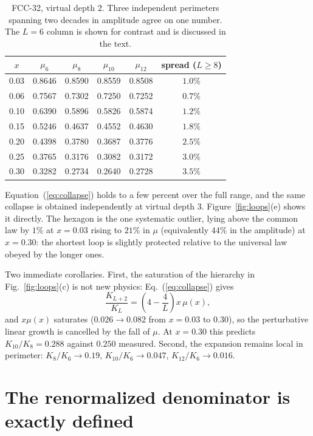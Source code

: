 \documentclass[aps,prb,preprint,amsmath,amssymb,superscriptaddress,
longbibliography,floatfix]{revtex4-2}
\begin{document}
\begin{table}[b]
\caption{FCC-32, virtual depth $2$.  Three independent perimeters spanning two
decades in amplitude agree on one number.  The $L=6$ column is shown for
contrast and is discussed in the text.}
\label{tab:collapse}
\begin{ruledtabular}
\begin{tabular}{cccccc}
$x$ & $\mu_6$ & $\mu_8$ & $\mu_{10}$ & $\mu_{12}$ & spread ($L\ge8$)\\ \hline
0.03 & 0.8646 & 0.8590 & 0.8559 & 0.8508 & $1.0\%$\\
0.06 & 0.7567 & 0.7302 & 0.7250 & 0.7252 & $0.7\%$\\
0.10 & 0.6390 & 0.5896 & 0.5826 & 0.5874 & $1.2\%$\\
0.15 & 0.5246 & 0.4637 & 0.4552 & 0.4630 & $1.8\%$\\
0.20 & 0.4398 & 0.3780 & 0.3687 & 0.3776 & $2.5\%$\\
0.25 & 0.3765 & 0.3176 & 0.3082 & 0.3172 & $3.0\%$\\
0.30 & 0.3282 & 0.2734 & 0.2640 & 0.2728 & $3.5\%$\\
\end{tabular}
\end{ruledtabular}
\end{table}

Equation~(\ref{eq:collapse}) holds to a few percent over the full range, and
the same collapse is obtained independently at virtual depth $3$.
Figure~\ref{fig:loops}(e) shows it directly.  The hexagon is the one
systematic outlier, lying above the common law by $1\%$ at $x=0.03$ rising to
$21\%$ in $\mu$ (equivalently $44\%$ in the amplitude) at $x=0.30$: the
shortest loop is slightly protected relative to the universal law obeyed by the
longer ones.

Two immediate corollaries.  First, the saturation of the hierarchy in
Fig.~\ref{fig:loops}(c) is not new physics: Eq.~(\ref{eq:collapse}) gives
\begin{equation}
 \frac{K_{L+2}}{K_L}=\left(4-\frac4L\right)x\,\mu(x) ,
 \label{eq:ratio}
\end{equation}
and $x\mu(x)$ saturates ($0.026\rightarrow0.082$ from $x=0.03$ to $0.30$), so
the perturbative linear growth is cancelled by the fall of $\mu$.  At $x=0.30$
this predicts $K_{10}/K_8=0.288$ against $0.250$ measured.  Second, the
expansion remains local in perimeter: $K_8/K_6\rightarrow0.19$,
$K_{10}/K_6\rightarrow0.047$, $K_{12}/K_6\rightarrow0.016$.

\section{The renormalized denominator is exactly defined}
\label{sec:deff}
\end{document}
